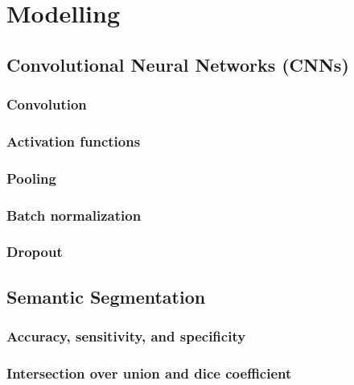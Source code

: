 \chapter{Modelling}%
\label{sec:modeling}


\section{Convolutional Neural Networks (CNNs)}%
\label{sec:cnn}

\subsection{Convolution}

\subsection{Activation functions}

\subsection{Pooling}

\subsection{Batch normalization}

\subsection{Dropout}



\section{Semantic Segmentation}%
\label{sec:semantic-segmentation}

\subsection{Accuracy, sensitivity, and specificity}

\subsection{Intersection over union and dice coefficient}

